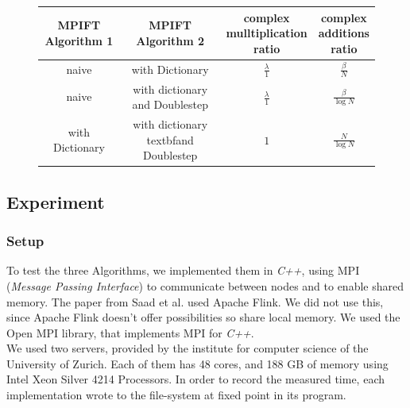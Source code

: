 \documentclass[12pt]{article}
\begin{document}
\begin{figure} [H]
\begin{center}
	\begin{tabular}{||c c c c||} 
		\hline
		\shortstack{MPIFT \\Algorithm 1} & \shortstack{MPIFT \\ Algorithm 2} & \shortstack{complex \\mulltiplication \\ ratio} & \shortstack{complex\\ additions\\ratio} \\ [0.5ex] 
		\hline\hline
		naive & with Dictionary & $\frac{\lambda}{1}$ & $\frac{\beta}{N}$ \\ 
		\hline
		naive & \shortstack{with dictionary \\and Doublestep} & $\frac{\lambda}{1}$ & $\frac{\beta}{\log{N}}$ \\
		\hline
		with Dictionary & \shortstack{with dictionary \\textbf{and} Doublestep} & $1$ & $\frac{N}{\log{N}}$ \\  
		\hline
	\end{tabular}
\end{center}
\label{fig::comparing_ratio}
\end{figure}

\subsection{Experiment}
\label{sec::Experiment}

\subsubsection{Setup}
\label{sec::setup}

To test the three Algorithms, we implemented them in \emph{C++}, using MPI (\emph{Message Passing Interface}) to communicate between nodes and to enable shared memory. The paper from Saad et al. used Apache Flink. We did not use this, since Apache Flink doesn't offer possibilities so share local memory. We used the Open MPI library, that implements MPI for \emph{C++}.\\

We used two servers, provided by the institute for computer science of the University of Zurich. Each of them has 48 cores, and 188 GB of memory using Intel Xeon Silver 4214 Processors. In order to record the measured time, each implementation wrote to the file-system at fixed point in its program.
\end{document}
